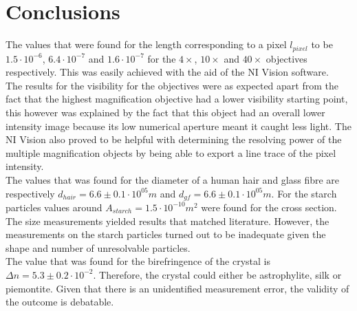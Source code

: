 \section{Conclusions}

The values that were found  for the length corresponding to a pixel $l_{pixel}$ to be $1.5\cdot10^{-6}$, $6.4\cdot10^{-7}$ and $1.6\cdot10^{-7}$ for the $4\times$, $10\times$ and $40\times$ objectives respectively. This was easily achieved with the aid of the NI Vision software.\\
The results for the visibility for the objectives were as expected apart from the fact that the highest magnification objective had a lower visibility starting point, this however was explained by the fact that this object had an overall lower intensity image because its low numerical aperture meant it caught less light. The NI Vision also proved to be helpful with determining the resolving power of the multiple magnification objects by being able to export a line trace of the pixel intensity.\\
The values that was found for the diameter of a human hair and glass fibre are respectively $d_{hair}=6.6\pm0.1\cdot10^{05} m$ and $d_{gf}=6.6\pm0.1\cdot10^{05} m$. For the starch particles values around $A_{starch}=1.5\cdot10^{-10} m^2$ were found for the cross section. The size measurements yielded results that matched literature. However, the measurements on the starch particles turned out to be inadequate given the shape and number of unresolvable particles.\\
The value that was found for the birefringence of the crystal is $\Delta n = 5.3\pm0.2\cdot10^{-2}$. Therefore, the crystal could either be astrophylite, silk or piemontite. Given that there is an unidentified measurement error, the validity of the outcome is debatable.\\

